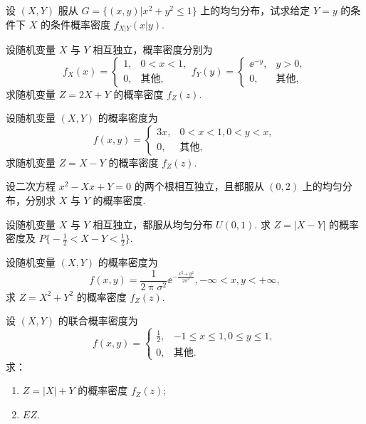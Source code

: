 	\begin{titwo}
		设 $(X,Y)$ 服从 $G = \bigl\{ (x,y) | x^{2} + y^{2} \leq 1 \bigr\}$ 上的均匀分布，试求给定 $Y = y$ 的条件下 $X$ 的条件概率密度 $f_{X|Y}(x|y)$.
	\end{titwo}

	\begin{titwo}
		设随机变量 $X$ 与 $Y$ 相互独立，概率密度分别为
		\[
			f_{X}(x) = \begin{cases}
				1, & 0 < x < 1, \\
				0, & \text{其他},
			\end{cases}
			f_{Y}(y) = \begin{cases}
				\ee^{-y}, & y > 0, \\
				0, & \text{其他},
			\end{cases}
		\]
		求随机变量 $Z = 2X + Y$ 的概率密度 $f_{Z}(z)$.
	\end{titwo}

	\begin{titwo}
		设随机变量 $(X,Y)$ 的概率密度为
		\[
			f(x,y) = \begin{cases}
				3x, & 0 < x < 1, 0 < y < x, \\
				0, & \text{其他},
			\end{cases}
		\]
		求随机变量 $Z = X - Y$ 的概率密度 $f_{Z}(z)$.
	\end{titwo}

	\begin{titwo}
		设二次方程 $x^{2} - Xx + Y = 0$ 的两个根相互独立，且都服从 $(0,2)$ 上的均匀分布，分别求 $X$ 与 $Y$ 的概率密度.
	\end{titwo}

	\begin{titwo}
		设随机变量 $X$ 与 $Y$ 相互独立，都服从均匀分布 $U(0,1)$. 求 $Z = |X - Y|$ 的概率密度及 $P\bigl\{ - \frac{1}{2} < X - Y < \frac{1}{2} \bigr\}$.
	\end{titwo}

	\begin{titwo}
		设随机变量 $(X,Y)$ 的概率密度为
		\[
			f(x,y) = \frac{1}{2 \uppi \sigma^{2}} \ee^{ - \frac{ x^{2} + y^{2} }{ 2\sigma^{2} } }, -\infty < x,y < +\infty,
		\]
		求 $Z = X^{2} + Y^{2}$ 的概率密度 $f_{Z}(z)$.
	\end{titwo}

	\begin{titwo}
		设 $(X,Y)$ 的联合概率密度为
		\[
			f(x,y) = \begin{cases}
				\frac{1}{2}, & -1 \leq x \leq 1, 0 \leq y \leq 1, \\
				0, & \text{其他}.
			\end{cases}
		\]
		求：
		\begin{enumerate}
			\item $Z = |X| + Y$ 的概率密度 $f_{Z}(z)$;
			\item $EZ$.
		\end{enumerate}
	\end{titwo}

